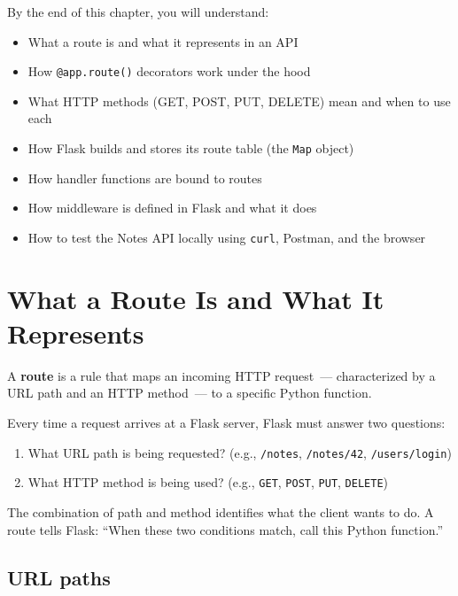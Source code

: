 \begin{objectives}

By the end of this chapter, you will understand:

\begin{itemize}
\tightlist
\item
  What a route is and what it represents in an API
\item
  How \texttt{@app.route()} decorators work under the hood
\item
  What HTTP methods (GET, POST, PUT, DELETE) mean and when to use each
\item
  How Flask builds and stores its route table (the \texttt{Map} object)
\item
  How handler functions are bound to routes
\item
  How middleware is defined in Flask and what it does
\item
  How to test the Notes API locally using \texttt{curl}, Postman, and the browser
\end{itemize}

\end{objectives}

\setcounter{section}{0}
\section{What a Route Is and What It Represents}\label{04-request-handling-paths:41-what-a-route-is-and-what-it-represents}

A \textbf{route} is a rule that maps an incoming HTTP request~--- characterized by a URL path and an HTTP method~--- to a specific Python function.

Every time a request arrives at a Flask server, Flask must answer two questions:

\begin{enumerate}
\def\labelenumi{\arabic{enumi}.}
\tightlist
\item
  What URL path is being requested? (e.g., \texttt{/notes}, \texttt{/notes/42}, \texttt{/users/login})
\item
  What HTTP method is being used? (e.g., \texttt{GET}, \texttt{POST}, \texttt{PUT}, \texttt{DELETE})
\end{enumerate}

\noindent{}The combination of path and method identifies what the client wants to do. A route tells Flask: ``When these two conditions match, call this Python function.''

\subsection*{URL paths}\label{04-request-handling-paths:url-paths}

